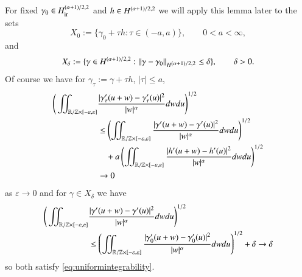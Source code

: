 For fixed $\gamma_0 \in H_{\mathrm{ir}}^{(\alpha+1)/2,2}$ and $h \in H^{\scriptstyle (\alpha+1)/2,2}$ we will apply this lemma later to the sets
\begin{equation*}
 X_0 := \{ \gamma_0 + \tau h: \tau \in (-a,a)\}, \qquad 0< a < \infty,
\end{equation*}
and 
\begin{equation*}
 X_\delta := \{ \gamma \in H^{\scriptstyle (\alpha+1)/2,2} : \|\gamma - \gamma_0\|_{H^{\scriptstyle (\alpha+1)/2,2}} \leq \delta\},\qquad\delta>0.
\end{equation*}
Of course we have for $\gamma_\tau := \gamma +\tau h$, $|\tau| \leq a $,
\begin{align}
  \Bigg( \iint_{\mathbb R / \mathbb Z \times [-\varepsilon, \varepsilon]} &
  \frac {|\gamma_\tau'(u+w) - \gamma_\tau'(u)|^2}{|w|^\alpha} dw du \Bigg)^{1/2}  \nonumber \\
  &\leq \left( \iint_{\mathbb R / \mathbb Z \times [-\varepsilon, \varepsilon]}
  \frac {|\gamma'(u+w) - \gamma'(u)|^2}{|w|^\alpha} dw du \right)^{1/2}
  \nonumber\\ 
  & \quad +  a \left( \iint_{\mathbb R / \mathbb Z \times [-\varepsilon, \varepsilon]}
  \frac {|h'(u+w) - h'(u)|^2}{|w|^\alpha} dw du \right)^{1/2} 
  \nonumber\\
  &\rightarrow 0\label{eq:X0}
\end{align}
as $\varepsilon \rightarrow 0$ and
for $\gamma \in X_\delta$ we have
\begin{equation}
  \begin{aligned}
  \Bigg( \iint_{\mathbb R / \mathbb Z \times [-\varepsilon, \varepsilon]} &
  \frac {|\gamma'(u+w) - \gamma'(u)|^2}{|w|^\alpha} dw du \Bigg)^{1/2} \\
  &\leq \left( \iint_{\mathbb R / \mathbb Z \times [-\varepsilon, \varepsilon]}
  \frac {|\gamma_0'(u+w) - \gamma_0'(u)|^2}{|w|^\alpha} dw du \right)^{1/2}
 +  \delta \rightarrow \delta\label{eq:Xdelta}
\end{aligned}
\end{equation}
so both satisfy \eqref{eq:uniformintegrability}.

